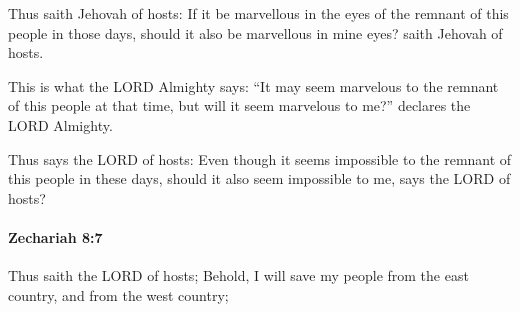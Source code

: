 			\begin{versebox}
					\item[BHS] 
					\item[LXX] 
					\item[ASV] Thus saith Jehovah of hosts: If it be marvellous in the eyes of the remnant of this people in those days, should it also be marvellous in mine eyes? saith Jehovah of hosts.
					\item[NIV] This is what the LORD Almighty says: “It may seem marvelous to the remnant of this people at that time, but will it seem marvelous to me?” declares the LORD Almighty.
					\item[NRSV] Thus says the LORD of hosts: Even though it seems impossible to the remnant of this people in these days, should it also seem impossible to me, says the LORD of hosts?
			\end{versebox}

		\paragraph{Zechariah 8:7} %
			\label{ZECHARIAH-8-7}

			Thus saith the LORD of hosts; Behold, I will save my people from the east country, and from the west country;

